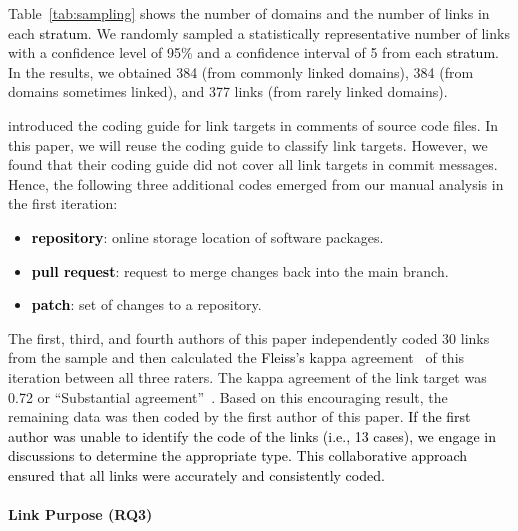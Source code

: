 \documentclass[smallextended]{svjour3}       %
\newcommand{\fix}[1]{\textcolor{black}{#1}}
\begin{document}
Table~\ref{tab:sampling} shows the number of domains and the number of links in each \fix{stratum}. We randomly sampled a statistically representative number of links with a confidence level of 95\% and a confidence interval of 5 from each \fix{stratum}. In the results, we obtained 384 (from commonly linked domains), 384 (from domains sometimes linked), and 377 links (from rarely linked domains).




\cite{hata20199} introduced the coding guide for link targets in comments of source code files. In this paper, we will reuse the coding guide to classify link targets. However, we found that their coding guide did not cover all link targets in commit messages. Hence, the following three additional codes emerged from our manual analysis in the first iteration: 
\begin{itemize}
\item \fix{\textbf{repository}}: online storage location of software packages.
\item \fix{\textbf{pull request}}: request to merge changes back into the main branch.
\item \fix{\textbf{patch}}: set of changes to a repository.
\end{itemize}

The first, third, and fourth authors 
of this paper independently coded 30 links from the sample and then calculated the \fix{Fleiss's k}appa agreement~\citep{fleiss1971measuring} of this iteration between all three raters. The kappa agreement of the link target was 0.72 or ``Substantial agreement''~\citep{viera2005understanding}. Based on this encouraging result, the remaining data was then coded by the first author of this paper. \fix{If the first author was unable to identify the code of the links (i.e., 13 cases), we engage in discussions to determine the appropriate type. This collaborative approach ensured that all links were accurately and consistently coded.}


\paragraph{Link Purpose (RQ3)}
\end{document}
